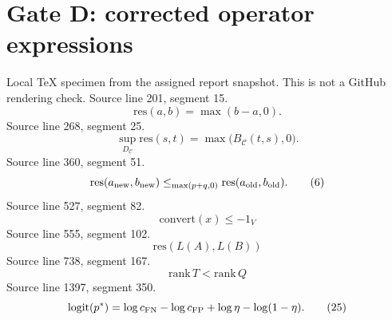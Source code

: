 \documentclass[11pt]{article}
\begin{document}
\section*{Gate D: corrected operator expressions}
Local TeX specimen from the assigned report snapshot. This is not a GitHub rendering check.
Source line 201, segment 15.
\[
\mathrm{res}(a,b)=\max(b-a,0).
\]
Source line 268, segment 25.
\[
\sup_{D_{\mathcal C}}\mathrm{res}(s,t)
 =\max\bigl(B_{\mathcal C}(t,s),0\bigr).
\tag{3}
\]
Source line 360, segment 51.
\[
\mathrm{res}(a_{\rm new},b_{\rm new})
 \le_{\max(p+q,0)}
\mathrm{res}(a_{\rm old},b_{\rm old}).
\tag{6}
\]
Source line 527, segment 82.
\[
\mathrm{convert}(x)\le-1_V
\]
Source line 555, segment 102.
\[
\mathrm{res}(L(A),L(B))
\]
Source line 738, segment 167.
\[
\mathrm{rank}\,T<\mathrm{rank}\,Q
\]
Source line 1397, segment 350.
\[
\mathrm{logit}(p^*)
 =\log c_{\rm FN}-\log c_{\rm FP}
  +\log\eta-\log(1-\eta).
\tag{25}
\]
\clearpage
\end{document}
